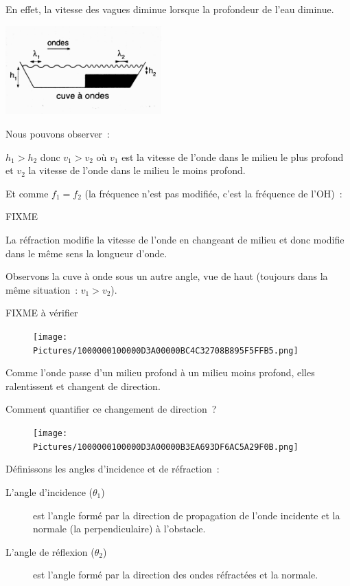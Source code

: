 En effet, la vitesse des vagues diminue lorsque la profondeur de l'eau
diminue.

\includegraphics[width=6.017cm,height=3.408cm]{Pictures/1000000100000A3C000005CCA7E68DBE45CF2A53.png}

Nous pouvons observer~:

$h_1 > h_2$ donc $v_1 > v_2$
où $v_1$ est la vitesse de l'onde dans le milieu le plus profond et $v_2$ la
vitesse de l'onde dans le milieu le moins profond.

Et comme $f_1 = f_2$ (la fréquence n'est pas modifiée, c'est la fréquence de
l'OH)~:

FIXME 

La réfraction modifie la vitesse de l'onde en changeant de milieu et
donc modifie dans le même sens la longueur d'onde.

Observons la cuve à onde sous un autre angle, vue de haut (toujours dans
la même situation~: $v_1>  v_2$).

FIXME à vérifier

\begin{figure}
\centering
\texttt{[image: Pictures/1000000100000D3A00000BC4C32708B895F5FFB5.png]}
\caption{}
\end{figure}

Comme l'onde passe d'un milieu profond à un milieu moins profond, elles
ralentissent et changent de direction.

Comment quantifier ce changement de direction~?

\begin{figure}
\centering
\texttt{[image: Pictures/1000000100000D3A00000B3EA693DF6AC5A29F0B.png]}
\caption{}
\end{figure}

Définissons les angles d'incidence et de réfraction~:
\begin{description}
	\item[L'angle d'incidence ($\theta_1$)}] est l'angle formé par la direction
de propagation de l'onde incidente et la normale (la perpendiculaire) à
l'obstacle. 
    \item[L'angle de réflexion ($\theta_2$)}] est l'angle formé par la direction
des ondes réfractées et la normale.
\end{description}

